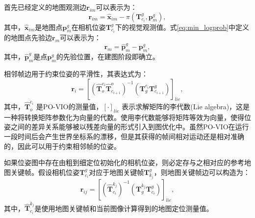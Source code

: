 首先已经定义的地图观测边$\symbf{r}_{im}$可以表示为：
\begin{equation}
  \symbf{r}_{im} = \hat{\symbf{x}}_{im} - \pi(\symbf{T}_{c_{i}}^g, \symbf{p}^g_m),
\end{equation}
其中，$\hat{\symbf{x}}_{im}$是地图点$\symbf{p}^g_m$在相机位姿$\symbf{T}_{c_{i}}^g$下的视觉观测值。式\eqref{eq:min_logprob}中定义的地图点先验边$\symbf{r}_m$可以表示为：
\begin{equation}
  \symbf{r}_{m} = \hat{\symbf{p}}^g_m - \symbf{p}^g_m,
\end{equation}
其中，$\hat{\symbf{p}}^g_m$是点$\symbf{p}^g_m$的先验位置，在建图阶段即确立。

相邻帧边用于约束位姿的平滑性，其表达式为：
\begin{equation}
    \symbf{r}_i = [(\hat{\symbf{T}}^{c_i}_{o} \hat{\symbf{T}}^{o}_{c_{i+1}})^{-1} (\symbf{T}^{c_{i}}_g \symbf{T}_{c_{i+1}}^g)]_{lie},
\end{equation}
其中，$\hat{\symbf{T}}^{c_i}_{o}$ 是PO-VIO的测量值，$[\cdot]_{lie}$ 表示求解矩阵的李代数(Lie algebra)\cite{bourbaki1989lie}，这是一种将转换矩阵参数化为向量的代数。使用李代数能够将矩阵等效为向量，使得位姿之间的差异关系能够被以残差向量的形式引入到图优化中。虽然PO-VIO在运行一段时间后会产生世界坐标系的漂移，但是其获得的帧间相对运动还是相对准确的，因此可以用于约束相邻帧的位姿。

如果位姿图中存在由粗到细定位初始化的相机位姿，则必定存与之相对应的参考地图关键帧。假设相机位姿$\symbf{T}_{c_{i}}^g$对应于地图关键帧$\symbf{T}_{k_{j}}^g$，则地图关键帧边可以构造为：
\begin{equation}
    \symbf{r}_{ij} = [(\hat{\symbf{T}}^{k_j}_{c_{i}})^{-1} (\symbf{T}^{k_{j}}_g \symbf{T}_{c_{i}}^g)]_{lie},
\end{equation}
其中，$\hat{\symbf{T}}^{k_j}_{c_{i}}$是使用地图关键帧和当前图像计算得到的地图定位测量值。

